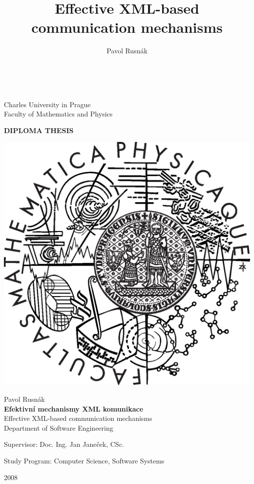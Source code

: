 \documentclass[12pt,notitlepage]{report}
\title{Effective XML-based communication mechanisms}
\author{Pavol Rusnák}
\begin{document}
\newtheorem{definition}{Definition}
\lstset{language=C}


\begin{titlepage}
\begin{center}
\ \\

\vspace{5mm}

\large
Charles University in Prague\\
Faculty of Mathematics and Physics\\

\vspace{10mm}

{\Large\bf DIPLOMA THESIS}

\vspace{10mm}

\includegraphics[scale=0.3]{logo_mff.eps}

\vspace{10mm}

{\Large Pavol Rusnák}\\
\vspace{15mm}
{\Large\bf Efektivní mechanismy XML komunikace}\\
\vspace{3mm}
Effective XML-based communication mechanisms\\
\vspace{10mm}
Department of Software Engineering
\vspace{15mm}

\large
\noindent Supervisor: Doc. Ing. Jan Janeček, CSc.
\vspace{5mm}

\noindent Study Program: Computer Science, Software Systems
\vspace{5mm}

2008
\end{center}

\end{titlepage}
\end{document}
